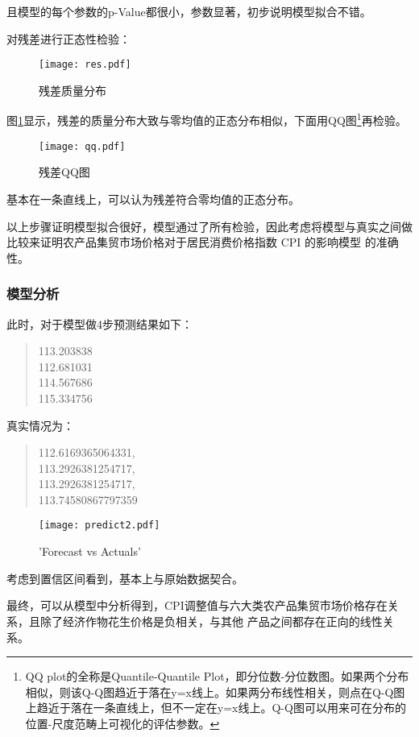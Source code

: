 \documentclass[a4paper,AutoFakeBold,AutoFakeSlant]{ctexart}
\begin{document}
且模型的每个参数的p-Value都很小，参数显著，初步说明模型拟合不错。

对残差进行正态性检验：
\begin{figure}[htbp]
  \texttt{[image: res.pdf]}
  \caption{残差质量分布}
  \label{f16}
\end{figure}

图\ref{f16}显示，残差的质量分布大致与零均值的正态分布相似，下面用QQ图\footnote{QQ plot的全称是Quantile-Quantile Plot，即分位数-分位数图。如果两个分布相似，则该Q-Q图趋近于落在y=x线上。如果两分布线性相关，则点在Q-Q图上趋近于落在一条直线上，但不一定在y=x线上。Q-Q图可以用来可在分布的位置-尺度范畴上可视化的评估参数。}再检验。
\begin{figure}[htbp]
  \centering
  \texttt{[image: qq.pdf]}
  \caption{残差QQ图}
  \label{f17}
\end{figure}

基本在一条直线上，可以认为残差符合零均值的正态分布。

以上步骤证明模型拟合很好，模型通过了所有检验，因此考虑将模型与真实之间做比较来证明农产品集贸市场价格对于居民消费价格指数 CPI 的影响模型
的准确性。
\newpage

\subsubsection{模型分析}
此时，对于模型做4步预测结果如下：
\begin{quote}
  113.203838\\
  112.681031\\
  114.567686\\
  115.334756
\end{quote}

真实情况为：
\begin{quote}
  112.6169365064331,\\
 113.2926381254717,\\
 113.2926381254717,\\
 113.74580867797359
\end{quote}

\begin{figure}[htbp]
  \centering
  \texttt{[image: predict2.pdf]}
  \caption{'Forecast vs Actuals'}
  \label{f18}
\end{figure}

考虑到置信区间看到，基本上与原始数据契合。

最终，可以从模型中分析得到，CPI调整值与六大类农产品集贸市场价格存在关系，且除了经济作物花生价格是负相关，与其他
产品之间都存在正向的线性关系。
\end{document}

